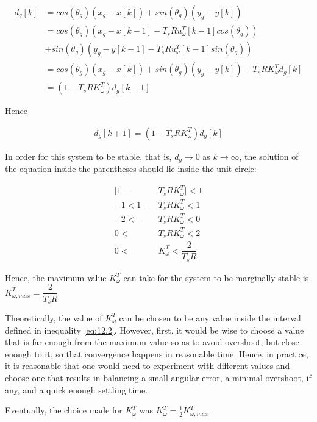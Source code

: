 \begin{align*}
  d_g[k] &= cos(\theta_g) (x_g - x[k]) + sin(\theta_g) (y_g - y[k]) \\
         &= cos(\theta_g) (x_g - x[k-1] - T_s R u_{\omega}^T[k-1] cos(\theta_g)) \\
         &+ sin(\theta_g) (y_g - y[k-1] - T_s R u_{\omega}^T[k-1] sin(\theta_g)) \\
         &= cos(\theta_g) (x_g - x[k]) + sin(\theta_g) (y_g - y[k]) -T_s R K_{\omega}^T d_g[k]  \\
         &= (1-T_s R K_{\omega}^T)d_g[k-1]
\end{align*}

Hence

\begin{align*}
  d_g[k+1]= (1-T_s R K_{\omega}^T)d_g[k]
\end{align*}

In order for this system to be stable, that is, $d_g \to 0$ as $k \to \infty$,
the solution of the equation inside the parentheses should lie inside the unit
circle:

\begin{align}
  \Big|1 - &T_s R K_{\omega}^T\Big| < 1 \nonumber \\
  -1 < 1 - &T_s R K_{\omega}^T < 1 \nonumber \\
  -2 < - &T_s R K_{\omega}^T < 0 \nonumber \\
   0 <\ &T_s R K_{\omega}^T < 2 \nonumber \\
   0 <\ &K_{\omega}^T < \dfrac{2}{T_s R} \label{eq:12.2}
\end{align}

Hence, the maximum value $K_{\omega}^T$ can take for the system to be marginally
stable is $K_{\omega,max}^T = \dfrac{2}{T_s R}$

Theoretically, the value of $K_{\omega}^T$ can be chosen to be any value inside
the interval defined in inequality \ref{eq:12.2}. However, first, it would be
wise to choose a value that is far enough from the maximum value so as to avoid
overshoot, but close enough to it, so that convergence happens in reasonable
time. Hence, in practice, it is reasonable that one would need to experiment
with different values and choose one that results in balancing a small angular
error, a minimal overshoot, if any, and a quick enough settling time.

Eventually, the choice made for $K_{\omega}^T$ was
$K_{\omega}^T = \frac{1}{2} K_{\omega,max}^T$.
